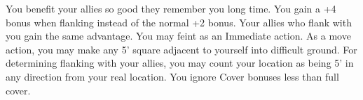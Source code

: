 {You benefit your allies so good they remember you long time.}
{You gain a +4 bonus when flanking instead of the normal +2 bonus. Your allies who flank with you gain the same advantage.}
{You may feint as an Immediate action.}
{As a move action, you may make any 5' square adjacent to yourself into difficult ground.}
{For determining flanking with your allies, you may count your location as being 5' in any direction from your real location.}
{You ignore Cover bonuses less than full cover.}